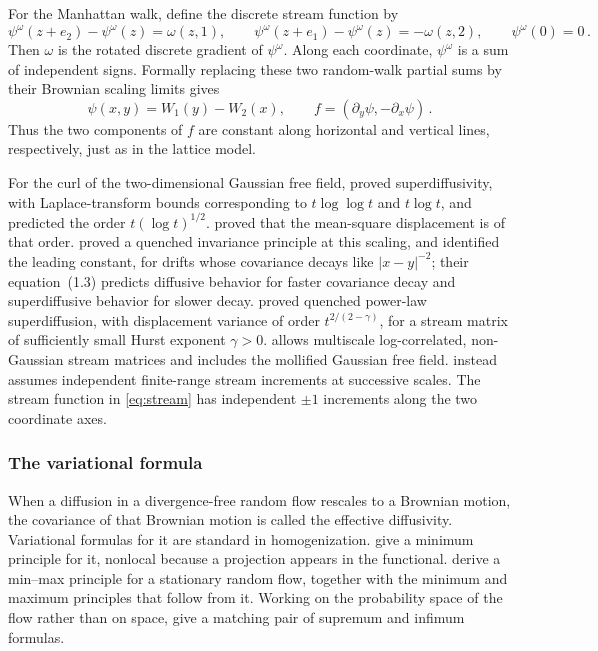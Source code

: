 \documentclass[11pt]{amsart}
\theoremstyle{plain}
\theoremstyle{definition}
\newcommand{\1}{\mathbf 1}
\newcommand{\abs}[1]{\lvert #1\rvert}
\begin{document}
For the Manhattan walk, define the discrete stream function by
\begin{equation}\label{eq:stream}
  \psi^\omega(z+e_2)-\psi^\omega(z)=\omega(z,1),
  \qquad
  \psi^\omega(z+e_1)-\psi^\omega(z)=-\omega(z,2),
  \qquad \psi^\omega(0)=0\, .
\end{equation}
Then $\omega$ is the rotated discrete gradient of $\psi^\omega$.  Along
each coordinate, $\psi^\omega$ is a sum of independent signs.  Formally
replacing these two random-walk partial sums by their Brownian scaling limits
gives
\[
  \psi(x,y)=W_1(y)-W_2(x),
  \qquad f=(\partial_y\psi,-\partial_x\psi)\, .
\]
Thus the two components of $f$ are constant along horizontal and vertical
lines, respectively, just as in the lattice model.

For the curl of the two-dimensional Gaussian free field,
\citet*[Theorem~1 and Remark~2]{TV12} proved superdiffusivity, with
Laplace-transform bounds corresponding to $t\log\log t$ and $t\log t$, and
predicted the order $t(\log t)^{1/2}$.
\citet*[Theorem~1.1]{CMOW25} proved that the mean-square displacement is of
that order.  \citet*[Theorem~A]{ABK24} proved a quenched invariance principle
at this scaling, and identified the leading constant, for drifts whose
covariance decays like $\abs{x-y}^{-2}$;
their equation~(1.3) predicts diffusive behavior for faster covariance decay
and superdiffusive behavior for slower decay.
\citet*[Theorem~A]{ABK26} proved quenched power-law superdiffusion, with
displacement variance of order $t^{2/(2-\gamma)}$, for a stream matrix of
sufficiently small Hurst exponent $\gamma>0$.
\citet*[Section~1.2]{ABK24} allows multiscale log-correlated, non-Gaussian
stream matrices and includes the mollified Gaussian free field.
\citet*[Section~1.5]{ABK26} instead assumes independent finite-range stream
increments at successive scales.  The stream function in
\eqref{eq:stream} has independent $\pm1$ increments along the two coordinate
axes.

\subsubsection{The variational formula}\label{sssec:variational}

When a diffusion in a divergence-free random flow rescales to a Brownian
motion, the covariance of that Brownian motion is called the effective
diffusivity.  Variational formulas for it are standard in homogenization.
\citet*[Section~V.1, (5.20)]{AM91} give a minimum principle for it, nonlocal
because a projection appears in the functional.
\citet*[Section~4.1, (4.22) and (4.43)--(4.44)]{FP96} derive a min--max
principle for a stationary random flow, together with the minimum and maximum
principles that follow from it.  Working on the probability space of the flow
rather than on space, \citet*[Proposition~5.1, (5.1)--(5.2)]{LOY98} give a
matching pair of supremum and infimum formulas.
\end{document}

